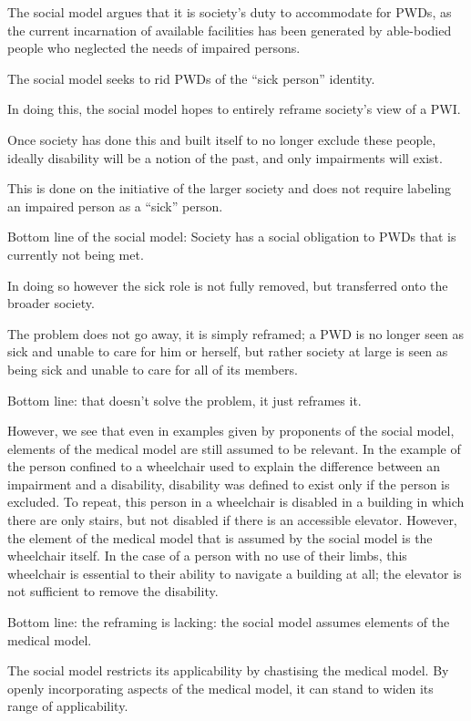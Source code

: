 \documentclass[a4paper]{article}
\begin{document}
The social model argues that it is society's duty to accommodate for PWDs, as
the current incarnation of available facilities has been generated by
able-bodied people who neglected the needs of impaired persons.

The social model seeks to rid PWDs of the ``sick person'' identity. 

In doing this, the social model hopes to entirely reframe society's view of a
PWI. 

Once society has done this and built itself to no longer exclude these people,
ideally disability will be a notion of the past, and only impairments will
exist. 

This is done on the initiative of the larger society and does not require
labeling an impaired person as a ``sick'' person.

Bottom line of the social model: Society has a social obligation to PWDs that
is currently not being met.



In doing so however the sick role is not fully removed, but transferred onto
the broader society. 

The problem does not go away, it is simply reframed; a PWD is no longer seen
as sick and unable to care for him or herself, but rather society at large is
seen as being sick and unable to care for all of its members.

Bottom line: that doesn't solve the problem, it just reframes it.


However, we see that even in examples given by proponents of the social model,
elements of the medical model are still assumed to be relevant. In the example
of the person confined to a wheelchair used to explain the difference between
an impairment and a disability, disability was defined to exist only if the
person is excluded. To repeat, this person in a wheelchair is disabled in a
building in which there are only stairs, but not disabled if there is an
accessible elevator. However, the element of the medical model that is assumed
by the social model is the wheelchair itself. In the case of a person with no
use of their limbs, this wheelchair is essential to their ability to navigate
a building at all; the elevator is not sufficient to remove the disability.

Bottom line: the reframing is lacking: the social model assumes elements of
the medical model.


The social model restricts its applicability by chastising the medical model.
By openly incorporating aspects of the medical model, it can stand to widen
its range of applicability.
\end{document}
